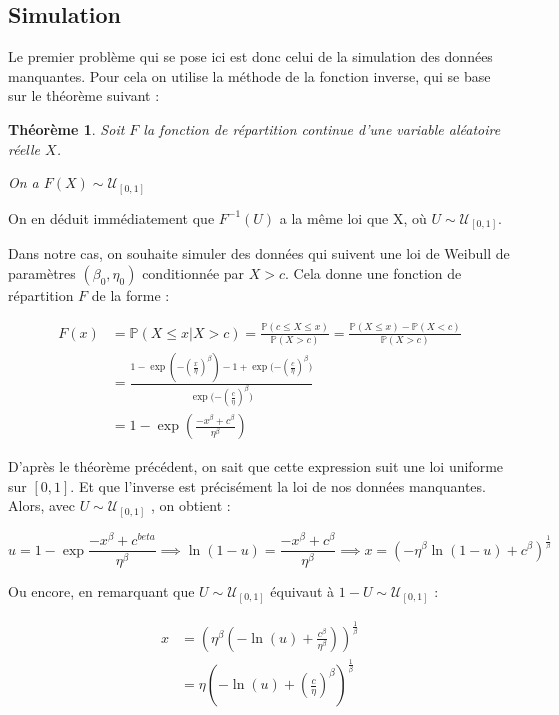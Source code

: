 \documentclass[a4paper]{report}
\newtheorem{theorem}{Théorème}
\begin{document}
  \subsection{Simulation}
  
  Le premier problème qui se pose ici est donc celui de la simulation des données manquantes. Pour cela on utilise la méthode de la fonction inverse, qui se base sur le théorème suivant : 
  
 \begin{theorem}
Soit $F$ la fonction de répartition continue d'une variable aléatoire réelle $X$. 

On a $F(X) \sim \mathcal{U}_{[0,1]}$
\end{theorem}
  
 On en déduit immédiatement que $F^{-1}(U)$ a la même loi que X, où $U\sim\mathcal{U}_{[0,1]}$. 
 
Dans notre cas, on souhaite simuler des données qui suivent une loi de Weibull de paramètres $(\beta_0,\eta_0)$ conditionnée par ${X>c}$. Cela donne une fonction de répartition $F$ de la forme :
 
 \begin{align*}
 F(x) & =  \mathbb{P}(X \leq x | X > c) = \frac{\mathbb{P}(c \leq X \leq x)}{\mathbb{P}(X>c)} 
= \frac{\mathbb{P} (X \leq x) - \mathbb{P}(X<c)}{\mathbb{P}(X>c)} \\
&= \frac{1-\exp{(-(\frac{x}{\eta})^{\beta})} - 1 + \exp{(-(\frac{c}{\eta})^{\beta}})}{\exp{(-(\frac{c}{\eta})^{\beta}})} \\
&= 1 - \exp{\left( \frac{-x^{\beta}+c^{\beta}}{\eta^{\beta}} \right)}
\end{align*}

D'après le théorème précédent, on sait que cette expression suit une loi uniforme sur $[0,1]$.
Et que l'inverse est précisément la loi de nos données manquantes. 
Alors, avec $U \sim \mathcal{U}_{[0,1]} $ , on obtient : 

\[
u = 1 - \exp{\frac{-x^{\beta}+c^{beta}}{\eta^{\beta}}}
\implies \ln (1-u) = \frac{-x^{\beta}+c^{\beta}}{\eta^{\beta}}
\implies x = \left( -\eta^{\beta} \ln{(1-u)} + c^{\beta} \right) ^{\frac{1}{\beta}}  
\]

Ou encore, en remarquant que $U \sim \mathcal{U}_{[0,1]}$ équivaut à $1-U \sim \mathcal{U}_{[0,1]}$ : 

\begin{align*}
x &= \left( \eta^\beta ( -\ln{(u)} + \frac{c^\beta}{\eta^\beta}) \right) ^{\frac{1}{\beta}}\\
&= \eta \left(-\ln{(u)} + (\frac{c}{\eta})^\beta \right)^{\frac{1}{\beta}}
\end{align*}
\end{document}
